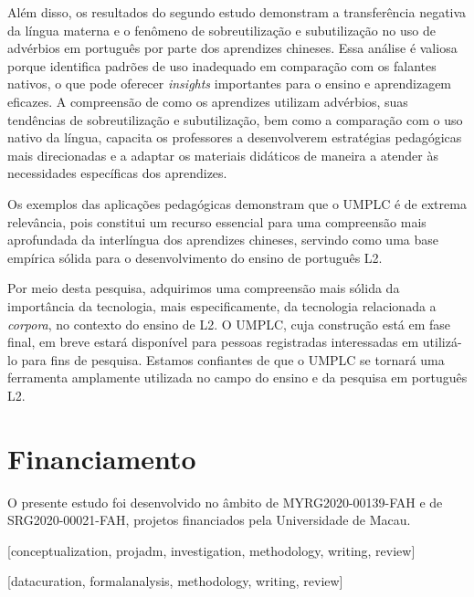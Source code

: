 \documentclass[portuguese]{textolivre}
\begin{document}
Além disso, os resultados do segundo estudo demonstram a transferência negativa da língua materna e o fenômeno de sobreutilização e subutilização no uso de advérbios em português por parte dos aprendizes chineses. Essa análise é valiosa porque identifica padrões de uso inadequado em comparação com os falantes nativos, o que pode oferecer \textit{insights} importantes para o ensino e aprendizagem eficazes. A compreensão de como os aprendizes utilizam advérbios, suas tendências de sobreutilização e subutilização, bem como a comparação com o uso nativo da língua, capacita os professores a desenvolverem estratégias pedagógicas mais direcionadas e a adaptar os materiais didáticos de maneira a atender às necessidades específicas dos aprendizes. 

Os exemplos das aplicações pedagógicas demonstram que o UMPLC é de extrema relevância, pois constitui um recurso essencial para uma compreensão mais aprofundada da interlíngua dos aprendizes chineses, servindo como uma base empírica sólida para o desenvolvimento do ensino de português L2.

Por meio desta pesquisa, adquirimos uma compreensão mais sólida da importância da tecnologia, mais especificamente, da tecnologia relacionada a \textit{corpora}, no contexto do ensino de L2. O UMPLC, cuja construção está em fase final, em breve estará disponível para pessoas registradas interessadas em utilizá-lo para fins de pesquisa. Estamos confiantes de que o UMPLC se tornará uma ferramenta amplamente utilizada no campo do ensino e da pesquisa em português L2.

\section{Financiamento}
O presente estudo foi desenvolvido no âmbito de MYRG2020-00139-FAH e de SRG2020-00021-FAH, projetos financiados pela Universidade de Macau.

\printbibliography\label{sec-bib}

\begin{contributors} [conceptualization, projadm, investigation, methodology, writing, review]


[datacuration, formalanalysis, methodology, writing, review]
\end{contributors}
\end{document}
